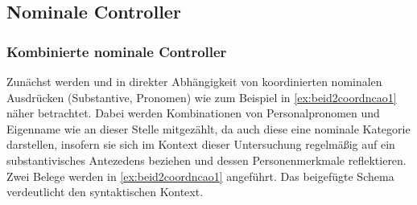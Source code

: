 \subsection{Nominale Controller}
\subsubsection{Kombinierte nominale Controller}
\label{subsubsec:perscombsgnp}

Zunächst werden  und  in direkter Abhängigkeit von
koordinierten nominalen Ausdrücken (Substantive, Pronomen) wie zum Beispiel
  in
\cref{ex:beid2coordncao1} näher betrachtet. Dabei werden Kombinationen von
Personalpronomen und Eigenname wie  an dieser Stelle
mitgezählt, da auch diese eine nominale Kategorie darstellen, insofern sie
sich im Kontext dieser Untersuchung regelmäßig auf ein substantivisches
Antezedens beziehen und dessen Personenmerkmale reflektieren.
Zwei Belege werden in \cref{ex:beid2coordncao1} angeführt. Das beigefügte
Schema verdeutlicht den syntaktischen Kontext.

